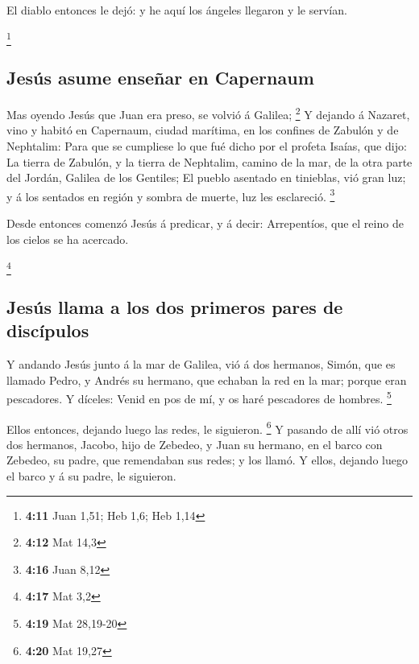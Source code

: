  El diablo entonces le dejó: y he aquí los ángeles
llegaron y le servían.

\footnote{\textbf{4:11} Juan 1,51; Heb 1,6; Heb 1,14}

\hypertarget{jesuxfas-asume-enseuxf1ar-en-capernaum}{%
\subsection{Jesús asume enseñar en
Capernaum}\label{jesuxfas-asume-enseuxf1ar-en-capernaum}}

 Mas oyendo Jesús que Juan era preso, se volvió á
Galilea; \footnote{\textbf{4:12} Mat 14,3}  Y dejando á
Nazaret, vino y habitó en Capernaum, ciudad marítima, en los confines de
Zabulón y de Nephtalim:  Para que se cumpliese lo que fué
dicho por el profeta Isaías, que dijo:  La tierra de
Zabulón, y la tierra de Nephtalim, camino de la mar, de la otra parte
del Jordán, Galilea de los Gentiles;  El pueblo asentado
en tinieblas, vió gran luz; y á los sentados en región y sombra de
muerte, luz les esclareció. \footnote{\textbf{4:16} Juan 8,12}

 Desde entonces comenzó Jesús á predicar, y á decir:
Arrepentíos, que el reino de los cielos se ha acercado.

\footnote{\textbf{4:17} Mat 3,2}

\hypertarget{jesuxfas-llama-a-los-dos-primeros-pares-de-discuxedpulos}{%
\subsection{Jesús llama a los dos primeros pares de
discípulos}\label{jesuxfas-llama-a-los-dos-primeros-pares-de-discuxedpulos}}

 Y andando Jesús junto á la mar de Galilea, vió á dos
hermanos, Simón, que es llamado Pedro, y Andrés su hermano, que echaban
la red en la mar; porque eran pescadores.  Y díceles:
Venid en pos de mí, y os haré pescadores de hombres. \footnote{\textbf{4:19}
  Mat 28,19-20}

 Ellos entonces, dejando luego las redes, le siguieron.
\footnote{\textbf{4:20} Mat 19,27}  Y pasando de allí vió
otros dos hermanos, Jacobo, hijo de Zebedeo, y Juan su hermano, en el
barco con Zebedeo, su padre, que remendaban sus redes; y los llamó.
 Y ellos, dejando luego el barco y á su padre, le
siguieron.

